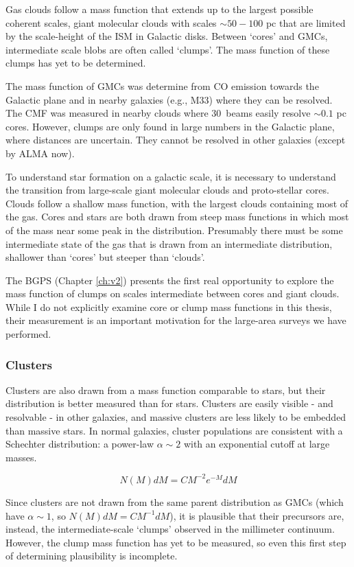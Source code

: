 Gas clouds follow a mass function that extends up to the largest
possible coherent scales, giant molecular clouds with scales $\sim50-100$ pc
that are limited by the scale-height of the ISM in Galactic disks.
Between `cores' and GMCs, intermediate scale blobs are often called `clumps'. 
The mass function of these clumps has yet to be determined.  

The mass function of GMCs was determine from CO emission towards the Galactic
plane and in nearby galaxies (e.g., M33) where they can be resolved.  The CMF
was measured in nearby clouds where 30\arcsec\ beams easily resolve $\sim0.1$
pc cores.  However, clumps are only found in large numbers in the Galactic
plane, where distances are uncertain.  They cannot be resolved in other
galaxies (except by ALMA now).

To understand star formation on a galactic scale, it is necessary to understand
the transition from large-scale giant molecular clouds and proto-stellar cores.
Clouds follow a shallow mass function, with the largest clouds containing most
of the gas.  Cores and stars are both drawn from steep mass functions in which
most of the mass near some peak in the distribution.  Presumably there must be
some intermediate state of the gas that is drawn from an intermediate
distribution, shallower than `cores' but steeper than `clouds'.  

The BGPS (Chapter \ref{ch:v2}) presents the first real opportunity to explore
the mass function of clumps on scales intermediate between cores and giant
clouds.   While I do not explicitly examine core or clump mass functions in this
thesis, their measurement is an important motivation for the large-area surveys
we have performed.

\subsubsection{Clusters}
Clusters are also drawn from a mass function comparable to stars, but
their distribution is better measured than for stars.  Clusters are
easily visible - and resolvable - in other galaxies, and massive clusters are
less likely to be embedded than massive stars.  In normal galaxies, cluster
populations are consistent with a Schechter distribution: a power-law
$\alpha\sim2$ with an exponential cutoff at large masses.

$$N(M)dM = C M^{-2} e^{-M} dM$$

Since clusters are not drawn from the same parent distribution as GMCs (which
have $\alpha\sim1$, so $N(M) dM = C M^{-1} dM$), it is plausible that their
precursors are, instead, the intermediate-scale `clumps' observed in the
millimeter continuum.  However, the clump mass function has yet to be measured,
so even this first step of determining plausibility is incomplete.

